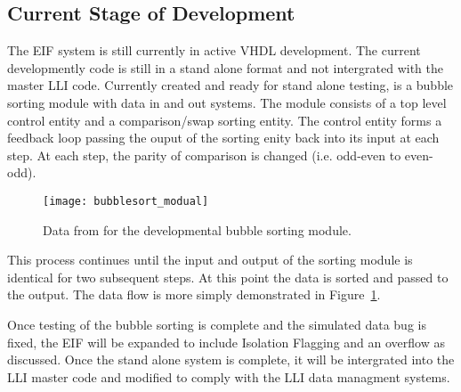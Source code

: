 
	\subsection{Current Stage of Development} 
		The EIF system is still currently in active VHDL development.
		The current developmently code is still in a stand alone format and not intergrated with the master LLI code.
		Currently created and ready for stand alone testing, is a bubble sorting module with data in and out systems.
		The module consists of a top level control entity and a comparison/swap sorting entity.
		The control entity forms a feedback loop passing the ouput of the sorting enity back into its input at each step.
		At each step, the parity of comparison is changed (i.e. odd-even to even-odd).
		\begin{figure}[h]
			\centering
			\texttt{[image: bubblesort\_modual]}
			\caption{Data from for the developmental bubble sorting module.}
			\label{fig:bubble_data_flow}
		\end{figure} \FloatBarrier
		\par
		This process continues until the input and output of the sorting module is identical for two subsequent steps.
		At this point the data is sorted and passed to the output.
		The data flow is more simply demonstrated in Figure~\ref{fig:bubble_data_flow}.
		\par
		Once testing of the bubble sorting is complete and the simulated data bug is fixed, the EIF will be expanded to include Isolation Flagging and an overflow as discussed.
		Once the stand alone system is complete, it will be intergrated into the LLI master code and modified to comply with the LLI data managment systems.
		\FloatBarrier